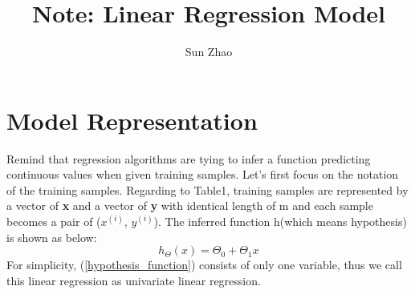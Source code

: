 \documentclass{article}
\title{Note: Linear Regression Model}
\author{Sun Zhao}
\begin{document}
\maketitle
\newpage

\section{Model Representation}
Remind that regression algorithms are tying to infer a function predicting continuous values when given training samples. Let's first focus on the notation of the training samples. Regarding to Table1, training samples are represented by a vector of \textbf{x} and a vector of \textbf{y} with identical length of m and each sample becomes a pair of ($x^{(i)}$, $y^{(i)}$). The inferred function h(which means hypothesis) is shown as below:\\

\begin{equation}\label{hypothesis_function}
  h_\Theta(x)=\Theta_0 + \Theta_1x
\end{equation}
For simplicity, (\ref{hypothesis_function}) consists of only one variable, thus we call this linear regression as univariate linear regression.
\end{document}
